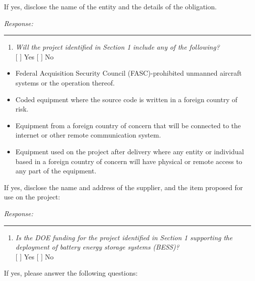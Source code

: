 \documentclass[
]{article}
\providecommand{\tightlist}{%
  \setlength{\itemsep}{0pt}\setlength{\parskip}{0pt}}
\begin{document}
If yes, disclose the name of the entity and the details of the
obligation.

\emph{Response:}

\begin{center}\rule{0.5\linewidth}{0.5pt}\end{center}

\begin{enumerate}
\def\labelenumi{\arabic{enumi}.}
\setcounter{enumi}{13}
\tightlist
\item
  \emph{Will the project identified in Section 1 include any of the
  following?}\\
  {[} {]} Yes {[} {]} No
\end{enumerate}

\begin{itemize}
\tightlist
\item
  Federal Acquisition Security Council (FASC)-prohibited unmanned
  aircraft systems or the operation thereof.
\item
  Coded equipment where the source code is written in a foreign country
  of risk.
\item
  Equipment from a foreign country of concern that will be connected to
  the internet or other remote communication system.
\item
  Equipment used on the project after delivery where any entity or
  individual based in a foreign country of concern will have physical or
  remote access to any part of the equipment.
\end{itemize}

If yes, disclose the name and address of the supplier, and the item
proposed for use on the project:

\emph{Response:}

\begin{center}\rule{0.5\linewidth}{0.5pt}\end{center}

\begin{enumerate}
\def\labelenumi{\arabic{enumi}.}
\setcounter{enumi}{14}
\tightlist
\item
  \emph{Is the DOE funding for the project identified in Section 1
  supporting the deployment of battery energy storage systems (BESS)?}\\
  {[} {]} Yes {[} {]} No
\end{enumerate}

If yes, please answer the following questions:
\end{document}
